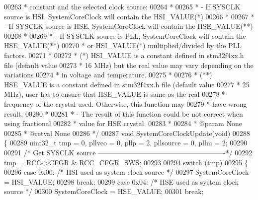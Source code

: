 \begin{DoxyCode}
00263 \textcolor{comment}{  *           constant and the selected clock source:}
00264 \textcolor{comment}{  *             }
00265 \textcolor{comment}{  *           - If SYSCLK source is HSI, SystemCoreClock will contain the HSI\_VALUE(*)}
00266 \textcolor{comment}{  *                                              }
00267 \textcolor{comment}{  *           - If SYSCLK source is HSE, SystemCoreClock will contain the HSE\_VALUE(**)}
00268 \textcolor{comment}{  *                          }
00269 \textcolor{comment}{  *           - If SYSCLK source is PLL, SystemCoreClock will contain the HSE\_VALUE(**) }
00270 \textcolor{comment}{  *             or HSI\_VALUE(*) multiplied/divided by the PLL factors.}
00271 \textcolor{comment}{  *         }
00272 \textcolor{comment}{  *         (*) HSI\_VALUE is a constant defined in stm32f4xx.h file (default value}
00273 \textcolor{comment}{  *             16 MHz) but the real value may vary depending on the variations}
00274 \textcolor{comment}{  *             in voltage and temperature.   }
00275 \textcolor{comment}{  *    }
00276 \textcolor{comment}{  *         (**) HSE\_VALUE is a constant defined in stm32f4xx.h file (default value}
00277 \textcolor{comment}{  *              25 MHz), user has to ensure that HSE\_VALUE is same as the real}
00278 \textcolor{comment}{  *              frequency of the crystal used. Otherwise, this function may}
00279 \textcolor{comment}{  *              have wrong result.}
00280 \textcolor{comment}{  *                }
00281 \textcolor{comment}{  *         - The result of this function could be not correct when using fractional}
00282 \textcolor{comment}{  *           value for HSE crystal.}
00283 \textcolor{comment}{  *     }
00284 \textcolor{comment}{  * @param  None}
00285 \textcolor{comment}{  * @retval None}
00286 \textcolor{comment}{  */}
00287 \textcolor{keywordtype}{void} SystemCoreClockUpdate(\textcolor{keywordtype}{void})
00288 \{
00289   uint32\_t tmp = 0, pllvco = 0, pllp = 2, pllsource = 0, pllm = 2;
00290 
00291   \textcolor{comment}{/* Get SYSCLK source -------------------------------------------------------*/}
00292   tmp = RCC->CFGR & RCC_CFGR_SWS;
00293 
00294   \textcolor{keywordflow}{switch} (tmp)
00295   \{
00296     \textcolor{keywordflow}{case} 0x00:  \textcolor{comment}{/* HSI used as system clock source */}
00297       SystemCoreClock = HSI_VALUE;
00298       \textcolor{keywordflow}{break};
00299     \textcolor{keywordflow}{case} 0x04:  \textcolor{comment}{/* HSE used as system clock source */}
00300       SystemCoreClock = HSE_VALUE;
00301       \textcolor{keywordflow}{break};

\end{DoxyCode}
